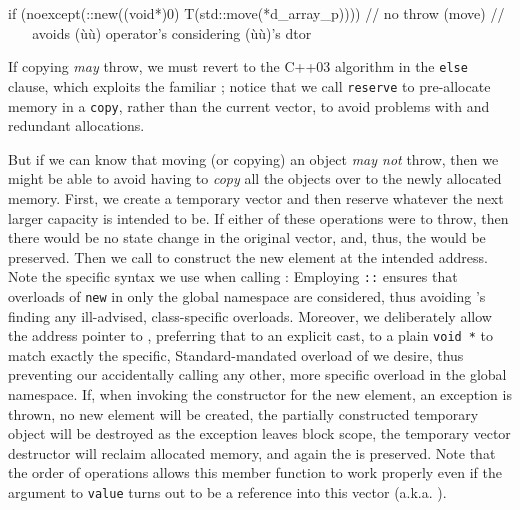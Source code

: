 \begin{emcppslisting}
 if (noexcept(::new((void*)0) T(std::move(*d_array_p))))  // no throw (move)
 //           ^^^^^^^^^^^^^^^ avoids (ù{}ù) operator's considering (ù{}ù)'s dtor
\end{emcppslisting}
    

\noindent If copying \emph{may} throw, we must revert to the C++03 algorithm in
the \lstinline!else! clause, which exploits the familiar ; notice that we call \lstinline!reserve! to pre-allocate memory in a
\lstinline!copy!, rather than the current vector, to avoid problems with
 and redundant allocations.

But if we can know that moving (or copying) an object \emph{may not}
throw, then we might be able to avoid having to \emph{copy} all the
objects over to the newly allocated memory. First, we create a temporary
vector and then reserve whatever the next larger capacity is intended to
be. If either of these operations were to throw, then there would be no
state change in the original vector, and, thus, the  would be preserved. Then we call
 to construct the new element at the
intended address. Note the specific syntax we use when calling
: Employing \lstinline!::! ensures that overloads of
\lstinline!new! in only the global namespace are considered, thus avoiding
's finding any ill-advised, class-specific overloads.
Moreover, we deliberately allow the address pointer to ,
preferring that to an explicit cast, to a plain \lstinline!void!~\lstinline!*!
to match exactly the specific, Standard-mandated overload of
 we desire, thus preventing our accidentally
calling any other, more specific overload in the global namespace. If,
when invoking the constructor for the new element, an exception is
thrown, no new element will be created, the partially constructed
temporary object will be destroyed as the exception leaves block scope,
the temporary vector destructor will reclaim allocated memory, and again
the  is preserved. Note that the order of
operations allows this member function to work properly even if the
argument to \lstinline!value! turns out to be a reference into this vector
(a.k.a. ).

